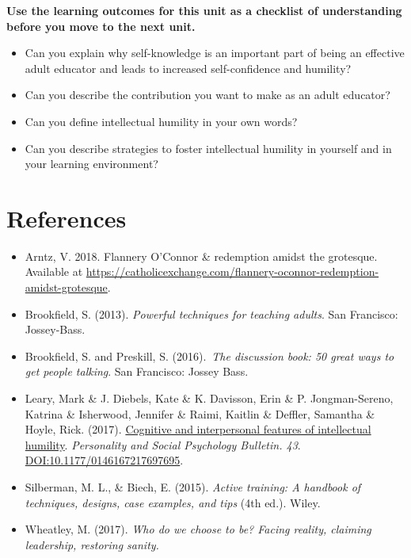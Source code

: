 \documentclass[
]{book}
\providecommand{\tightlist}{%
  \setlength{\itemsep}{0pt}\setlength{\parskip}{0pt}}
\begin{document}
\begin{progress}
\textbf{Use the learning outcomes for this unit as a checklist of understanding before you move to the next unit.}

\begin{itemize}
\tightlist
\item
  Can you explain why self-knowledge is an important part of being an effective adult educator and leads to increased self-confidence and humility?\\
\item
  Can you describe the contribution you want to make as an adult educator?\\
\item
  Can you define intellectual humility in your own words?\\
\item
  Can you describe strategies to foster intellectual humility in yourself and in your learning environment?
\end{itemize}
\end{progress}

\hypertarget{references-4}{%
\section*{References}\label{references-4}}

\begin{itemize}
\tightlist
\item
  Arntz, V. 2018. Flannery O'Connor \& redemption amidst the grotesque. Available at \url{https://catholicexchange.com/flannery-oconnor-redemption-amidst-grotesque}.\\
\item
  Brookfield, S. (2013). \emph{Powerful techniques for teaching adults}. San Francisco: Jossey-Bass.\\
\item
  Brookfield, S. and Preskill, S. (2016).~\emph{The discussion book: 50 great ways to get people talking}. San Francisco: Jossey Bass.\\
\item
  Leary, Mark \& J. Diebels, Kate \& K. Davisson, Erin \& P. Jongman-Sereno, Katrina \& Isherwood, Jennifer \& Raimi, Kaitlin \& Deffler, Samantha \& Hoyle, Rick. (2017). \href{https://journals-sagepub-com.ezproxy.student.twu.ca/doi/pdf/10.1177/0146167217697695?}{Cognitive and interpersonal features of intellectual humility}. \emph{Personality and Social Psychology Bulletin. 43}. \url{DOI:10.1177/0146167217697695}.\\
\item
  Silberman, M. L., \& Biech, E. (2015). \emph{Active training: A handbook of techniques, designs, case examples, and tips} (4th ed.). Wiley.
\item
  Wheatley, M. (2017). \emph{Who do we choose to be? Facing reality, claiming leadership, restoring sanity.}
\end{itemize}
\end{document}
